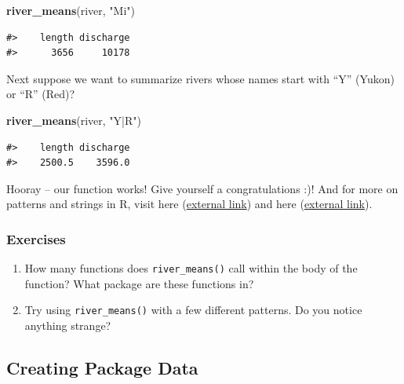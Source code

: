 \documentclass[
]{book}
\newenvironment{Shaded}{\begin{snugshade}}{\end{snugshade}}
\newcommand{\KeywordTok}[1]{\textcolor[rgb]{0.13,0.29,0.53}{\textbf{#1}}}
\newcommand{\NormalTok}[1]{#1}
\newcommand{\StringTok}[1]{\textcolor[rgb]{0.31,0.60,0.02}{#1}}
\begin{document}
\begin{Shaded}
\begin{Highlighting}[]
\KeywordTok{river_means}\NormalTok{(river, }\StringTok{"Mi"}\NormalTok{)}
\end{Highlighting}
\end{Shaded}

\begin{verbatim}
#>    length discharge 
#>      3656     10178
\end{verbatim}

Next suppose we want to summarize rivers whose names start with ``Y'' (Yukon) or ``R'' (Red)?

\begin{Shaded}
\begin{Highlighting}[]
\KeywordTok{river_means}\NormalTok{(river, }\StringTok{"Y|R"}\NormalTok{)}
\end{Highlighting}
\end{Shaded}

\begin{verbatim}
#>    length discharge 
#>    2500.5    3596.0
\end{verbatim}

Hooray -- our function works! Give yourself a congratulations :)! And for more on patterns and strings in R, visit here (\href{https://r4ds.had.co.nz/strings.html}{external link}) and here (\href{https://bookdown.org/rdpeng/rprogdatascience/regular-expressions.html\#sub-and-gsub}{external link}).

\hypertarget{ex-set2}{%
\subsubsection{Exercises}\label{ex-set2}}

\begin{enumerate}
\def\labelenumi{\arabic{enumi}.}
\item
  How many functions does \texttt{river\_means()} call within the body of the function? What package are these functions in?
\item
  Try using \texttt{river\_means()} with a few different patterns. Do you notice anything strange?
\end{enumerate}

\hypertarget{creating-data}{%
\subsection{Creating Package Data}\label{creating-data}}
\end{document}

